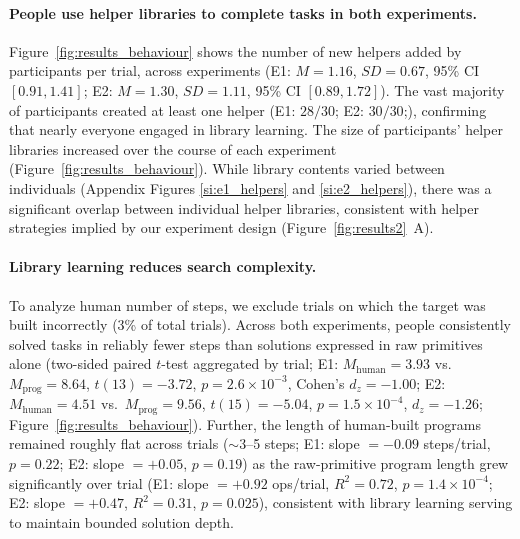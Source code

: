 \documentclass{article}
\begin{document}
\paragraph{People use helper libraries to complete tasks in both experiments.}
Figure~\ref{fig:results_behaviour} shows the number of new helpers added by participants per trial, across experiments 
(E1: $M = 1.16$, $SD = 0.67$, 95\% CI $[0.91, 1.41]$;
E2: $M = 1.30$, $SD = 1.11$, 95\% CI $[0.89, 1.72]$). The vast majority of participants created at least
one helper (E1: $28/30$; E2: $30/30$;), confirming that
nearly everyone engaged in library learning. 
The size of participants' helper libraries increased over the course of each experiment (Figure~\ref{fig:results_behaviour}). While library contents varied between individuals (Appendix Figures \ref{si:e1_helpers} and \ref{si:e2_helpers}), there was a significant overlap between individual helper libraries, consistent with helper strategies implied by our experiment design (Figure~\ref{fig:results2}~A). 


\paragraph{Library learning reduces search complexity.}
To analyze human number of steps, we exclude trials on which the target was built incorrectly (3\% of total trials).
Across both experiments, people consistently solved tasks in reliably fewer steps than solutions expressed in raw primitives alone (two-sided paired $t$-test aggregated by trial; E1: $M_{\text{human}}=3.93$ vs.\ $M_{\text{prog}}=8.64$, $t(13)=-3.72$, $p=2.6\times10^{-3}$, Cohen's $d_z=-1.00$; E2: $M_{\text{human}}=4.51$ vs.\ $M_{\text{prog}}=9.56$, $t(15)=-5.04$, $p=1.5\times10^{-4}$, $d_z=-1.26$; Figure~\ref{fig:results_behaviour}). 
Further, the length of human-built programs remained roughly flat across trials ($\sim$3--5 steps; E1: slope $=-0.09$ steps/trial, $p=0.22$; E2: slope $=+0.05$, $p=0.19$)
as the raw-primitive program length grew significantly over trial (E1: slope $=+0.92$ ops/trial, $R^2=0.72$, $p=1.4\times10^{-4}$; E2: slope $=+0.47$, $R^2=0.31$, $p=0.025$), consistent with library learning serving to maintain bounded solution depth.

\end{document}
